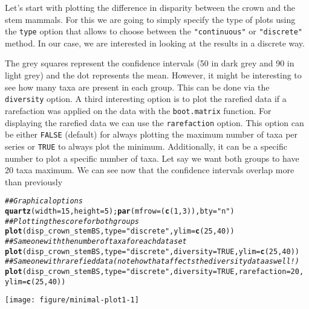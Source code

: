 \documentclass{article}\usepackage[]{graphicx}\usepackage[]{color}
\makeatletter
\newcommand{\hlnum}[1]{\textcolor[rgb]{0.686,0.059,0.569}{#1}}%
\newcommand{\hlstr}[1]{\textcolor[rgb]{0.192,0.494,0.8}{#1}}%
\newcommand{\hlcom}[1]{\textcolor[rgb]{0.678,0.584,0.686}{\textit{#1}}}%
\newcommand{\hlstd}[1]{\textcolor[rgb]{0.345,0.345,0.345}{#1}}%
\newcommand{\hlkwc}[1]{\textcolor[rgb]{0.333,0.667,0.333}{#1}}%
\newcommand{\hlkwd}[1]{\textcolor[rgb]{0.737,0.353,0.396}{\textbf{#1}}}%
\newenvironment{kframe}{%
 \def\at@end@of@kframe{}%
 \ifinner\ifhmode%
  \def\at@end@of@kframe{\end{minipage}}%
  \begin{minipage}{\columnwidth}%
 \fi\fi%
 \def\FrameCommand##1{\hskip\@totalleftmargin \hskip-\fboxsep
 \colorbox{shadecolor}{##1}\hskip-\fboxsep
     \hskip-\linewidth \hskip-\@totalleftmargin \hskip\columnwidth}%
 \MakeFramed {\advance\hsize-\width
   \@totalleftmargin\z@ \linewidth\hsize
   \@setminipage}}%
 {\par\unskip\endMakeFramed%
 \at@end@of@kframe}
\newenvironment{knitrout}{}{} %
\makeatother
\begin{document}
Let's start with plotting the difference in disparity between the crown and the stem mammals.
For this we are going to simply specify the type of plots using the \texttt{type} option that allows to choose between the \texttt{"continuous"} or \texttt{"discrete"} method.
In our case, we are interested in looking at the results in a discrete way.

The grey squares represent the confidence intervals (50 in dark grey and 90 in light grey) and the dot represents the mean.
However, it might be interesting to see how many taxa are present in each group.
This can be done via the \texttt{diversity} option.
A third interesting option is to plot the rarefied data if a rarefaction was applied on the data with the \texttt{boot.matrix} function.
For displaying the rarefied data we can use the \texttt{rarefaction} option.
This option can be either \texttt{FALSE} (default) for always plotting the maximum number of taxa per series or \texttt{TRUE} to always plot the minimum.
Additionally, it can be a specific number to plot a specific number of taxa.
Let say we want both groups to have 20 taxa maximum.
We can see now that the confidence intervals overlap more than previously

\begin{knitrout}
\color{fgcolor}\begin{kframe}
\begin{alltt}
\hlcom{## Graphical options}
\hlkwd{quartz}\hlstd{(}\hlkwc{width} \hlstd{=} \hlnum{15}\hlstd{,} \hlkwc{height} \hlstd{=} \hlnum{5}\hlstd{) ;} \hlkwd{par}\hlstd{(}\hlkwc{mfrow} \hlstd{= (}\hlkwd{c}\hlstd{(}\hlnum{1}\hlstd{,}\hlnum{3}\hlstd{)),} \hlkwc{bty} \hlstd{=} \hlstr{"n"}\hlstd{)}
\hlcom{## Plotting the score for both groups}
\hlkwd{plot}\hlstd{(disp_crown_stemBS,} \hlkwc{type} \hlstd{=} \hlstr{"discrete"} \hlstd{,} \hlkwc{ylim} \hlstd{=} \hlkwd{c}\hlstd{(}\hlnum{25}\hlstd{,}\hlnum{40}\hlstd{))}
\hlcom{## Same one with the number of taxa for each data set}
\hlkwd{plot}\hlstd{(disp_crown_stemBS,} \hlkwc{type} \hlstd{=} \hlstr{"discrete"}\hlstd{,} \hlkwc{diversity} \hlstd{=} \hlnum{TRUE}\hlstd{,} \hlkwc{ylim} \hlstd{=} \hlkwd{c}\hlstd{(}\hlnum{25}\hlstd{,}\hlnum{40}\hlstd{))}
\hlcom{## Same one with rarefied data (note how that affects the diversity data as well!)}
\hlkwd{plot}\hlstd{(disp_crown_stemBS,} \hlkwc{type} \hlstd{=} \hlstr{"discrete"}\hlstd{,} \hlkwc{diversity} \hlstd{=} \hlnum{TRUE}\hlstd{,} \hlkwc{rarefaction} \hlstd{=} \hlnum{20}\hlstd{,}
    \hlkwc{ylim} \hlstd{=} \hlkwd{c}\hlstd{(}\hlnum{25}\hlstd{,}\hlnum{40}\hlstd{))}
\end{alltt}
\end{kframe}

{\centering \texttt{[image: figure/minimal-plot1-1]} 

}



\end{knitrout}
\end{document}
